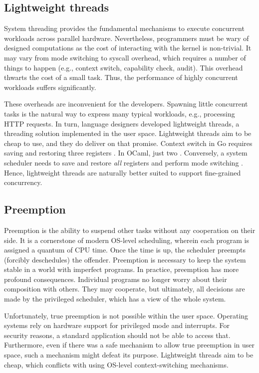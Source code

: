 \documentclass[12pt,a4paper,twoside]{report}
\begin{document}
\subsection{Lightweight threads}
\label{section:lightweight-threads}
System threading provides the fundamental mechanisms to execute concurrent workloads across parallel hardware. Nevertheless, programmers must be wary of designed computations as the cost of interacting with the kernel is non-trivial. It may vary from mode switching to syscall overhead, which requires a number of things to happen (e.g., context switch, capability check, audit). This overhead thwarts the cost of a small task. Thus, the performance of highly concurrent workloads suffers significantly.

These overheads are inconvenient for the developers. Spawning little concurrent tasks is the natural way to express many typical workloads, e.g., processing HTTP requests. In turn, language designers developed lightweight threads, a threading solution implemented in the user space. Lightweight threads aim to be cheap to use, and they do deliver on that promise. Context switch in Go requires saving and restoring three registers \cite{gorout_vs_os_thread}. In OCaml, just two \cite{Sivaramakrishnan2021}. Conversely, a system scheduler needs to save and restore \textit{all} registers and perform mode switching \cite{gorout_vs_os_thread}. Hence, lightweight threads are naturally better suited to support fine-grained concurrency. 

\subsection{Preemption}
\label{section:preemption}

Preemption is the ability to suspend other tasks without any cooperation on their side. It is a cornerstone of modern OS-level scheduling, wherein each program is assigned a quantum of CPU time. Once the time is up, the scheduler preempts (forcibly deschedules) the offender. Preemption is necessary to keep the system stable in a world with imperfect programs. In practice, preemption has more profound consequences. Individual programs no longer worry about their composition with others. They may cooperate, but ultimately, all decisions are made by the privileged scheduler, which has a view of the whole system.

Unfortunately, true preemption is not possible within the user space. Operating systems rely on hardware support for privileged mode and interrupts. For security reasons, a standard application should not be able to access that. Furthermore, even if there was a safe mechanism to allow true preemption in user space, such a mechanism might defeat its purpose. Lightweight threads aim to be cheap, which conflicts with using OS-level context-switching mechanisms.
\end{document}
